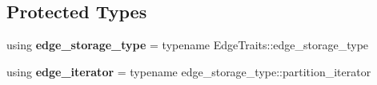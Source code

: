 \subsection*{Protected Types}
\begin{DoxyCompactItemize}
\item 
\mbox{\label{classsequoia_1_1maths_1_1graph__primitive_ad5028522912b7754095222975618915e}} 
using {\bfseries edge\+\_\+storage\+\_\+type} = typename Edge\+Traits\+::edge\+\_\+storage\+\_\+type
\item 
\mbox{\label{classsequoia_1_1maths_1_1graph__primitive_a98f0da927974fb015a2f0569504b7b89}} 
using {\bfseries edge\+\_\+iterator} = typename edge\+\_\+storage\+\_\+type\+::partition\+\_\+iterator
\end{DoxyCompactItemize}
